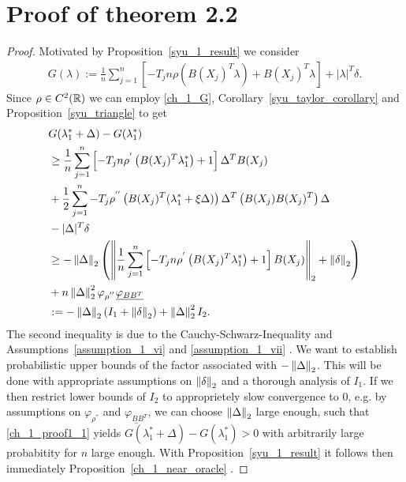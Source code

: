 \section*{Proof of theorem 2.2}


\begin{proof}
  Motivated by Proposition~\ref{syu_1_result}
  we consider
 \begin{gather}
   \label{ch_1_G}
   G(\lambda)
   :=
      \frac{1}{n}
      \sum_{j = 1}^{n} 
      \left[ 
        -T_j n 
        \rho 
        \left( 
          B(X_j)^T \lambda
        \right)
      +
      B(X_j)^T \lambda
      \right]
      +
      |\lambda|^T \delta.
 \end{gather} 
 Since 
 $\rho \in C^2(\mathbb{R})$
 we can employ 
 \eqref{ch_1_G},
 Corollary~\ref{syu_taylor_corollary}
 and
 Proposition~\ref{syu_triangle}
 to get
 \begin{align}
   \label{ch_1_proof1_1}
  \begin{split}
  & 
  G(\lambda^*_1 + \Delta) 
  -
  G(\lambda^*_1)
  \\
  &\ge
      \frac{1}{n}
      \sum_{j = 1}^{n} 
      \left[ 
        -T_j n 
        \rho^{'} 
        \left( 
          B(X_j)^T \lambda^*_1
        \right)
      +
      1
      \right]
      \Delta^T B(X_j)
      \\
  & +
      \frac{1}{2}
      \sum_{j = 1}^{n} 
        -T_j  
        \rho^{''} 
        \left( 
          B(X_j)^T (\lambda^*_1 + \xi \Delta)
        \right)
        \Delta^T
        \left( 
          B(X_j)
          B(X_j)^T
        \right)
        \Delta
        \\
  &-
      |\Delta|^T \delta
  \\
  &\ge
    - \left\lVert\Delta\right\rVert_2
    \left( 
    \left\lVert
      \frac{1}{n}
      \sum_{j = 1}^{n} 
      \left[ 
        -T_j n 
        \rho^{'} 
        \left( 
          B(X_j)^T \lambda^*_1
        \right)
      +
      1
      \right]
      B(X_j)
    \right\rVert_2
    +
    \left\lVert\delta\right\rVert_2
    \right)
    \\
  &+
  n
  \left\lVert\Delta\right\rVert^2_2
   \varphi_{\rho^{''}}
  \underline{\varphi_{BB^T}}
  \\
  &:=
  -\left\lVert\Delta\right\rVert_2
  (I_1 + \left\lVert\delta\right\rVert_2)
  +
  \left\lVert\Delta\right\rVert^2_2
  I_2
  .
  \end{split}
\end{align}
The second inequality is due to 
the Cauchy-Schwarz-Inequality 
and
Assumptions~\ref{assumption_1_vi} and \ref{assumption_1_vii}
.
We want to establish probabilistic upper bounds of the factor associated with 
$
  -\left\lVert\Delta\right\rVert_2
$. 
This will be done with appropriate assumptions on
$
  \left\lVert\delta\right\rVert_2
$
and a thorough analysis of $I_1$.
If we then restrict lower bounds of
$
  I_2
$
to approprietely slow convergence to 0,
e.g. by assumptions on
$
\varphi_{\rho^{''}}
$
and
$
\underline{
  \varphi_{BB^T}
}
$,
we can choose
$
  \left\lVert\Delta\right\rVert_2
$
large enough,
such that 
\eqref{ch_1_proof1_1}
yields
$
  G(\lambda^*_1 + \Delta) 
  -
  G(\lambda^*_1)
  >
  0
$
with arbitrarily large probabitity for $n$ large enough.
With Proposition~\ref{syu_1_result} it follows then immediately
Proposition~\ref{ch_1_near_oracle}
.

\end{proof}
